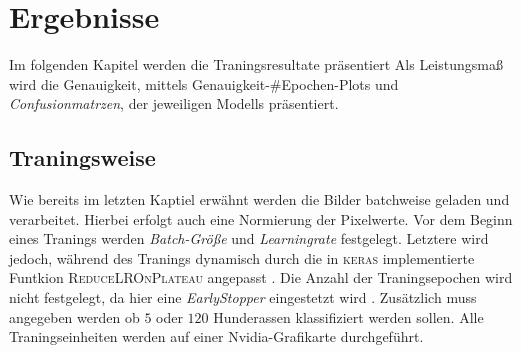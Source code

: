 \section{Ergebnisse}
Im folgenden Kapitel werden die Traningsresultate präsentiert
Als Leistungsmaß wird die Genauigkeit, mittels Genauigkeit-\#Epochen-Plots
und \emph{Confusionmatrzen}, der jeweiligen Modells präsentiert.

\subsection{Traningsweise}
Wie bereits im letzten Kaptiel erwähnt werden die
Bilder batchweise geladen und verarbeitet. Hierbei erfolgt auch eine Normierung
der Pixelwerte. Vor dem Beginn eines Tranings werden \emph{Batch-Größe} und
\emph{Learningrate} festgelegt. Letztere wird jedoch, während des Tranings dynamisch
durch die in \textsc{keras} implementierte Funtkion \textsc{ReduceLROnPlateau}
angepasst \cite{keras_ReduceLROnPlateau}. Die Anzahl der Traningsepochen
wird nicht festgelegt, da hier eine \emph{EarlyStopper} eingestetzt wird \cite{keras_EarlyStopping}.
Zusätzlich muss angegeben werden ob $5$ oder $120$ Hunderassen
klassifiziert werden sollen. Alle Traningseinheiten werden auf einer Nvidia-Grafikarte
durchgeführt.

